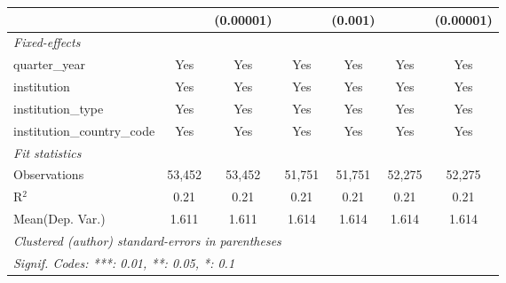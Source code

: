 \begin{tabular}{lcccccc}
                                      &         & (0.00001)    &             & (0.001)     &             & (0.00001)\\   
   \midrule
   \emph{Fixed-effects}\\
   quarter\_year                      & Yes     & Yes          & Yes         & Yes         & Yes         & Yes\\  
   institution                        & Yes     & Yes          & Yes         & Yes         & Yes         & Yes\\  
   institution\_type                  & Yes     & Yes          & Yes         & Yes         & Yes         & Yes\\  
   institution\_country\_code         & Yes     & Yes          & Yes         & Yes         & Yes         & Yes\\  
   \midrule
   \emph{Fit statistics}\\
   Observations                       & 53,452  & 53,452       & 51,751      & 51,751      & 52,275      & 52,275\\  
   R$^2$                              & 0.21    & 0.21         & 0.21        & 0.21        & 0.21        & 0.21\\  
Mean(Dep. Var.) & 1.611 & 1.611 & 1.614 & 1.614 & 1.614 & 1.614 \\
   \midrule \midrule
   \multicolumn{7}{l}{\emph{Clustered (author) standard-errors in parentheses}}\\
   \multicolumn{7}{l}{\emph{Signif. Codes: ***: 0.01, **: 0.05, *: 0.1}}\\
\end{tabular}
\par\endgroup
